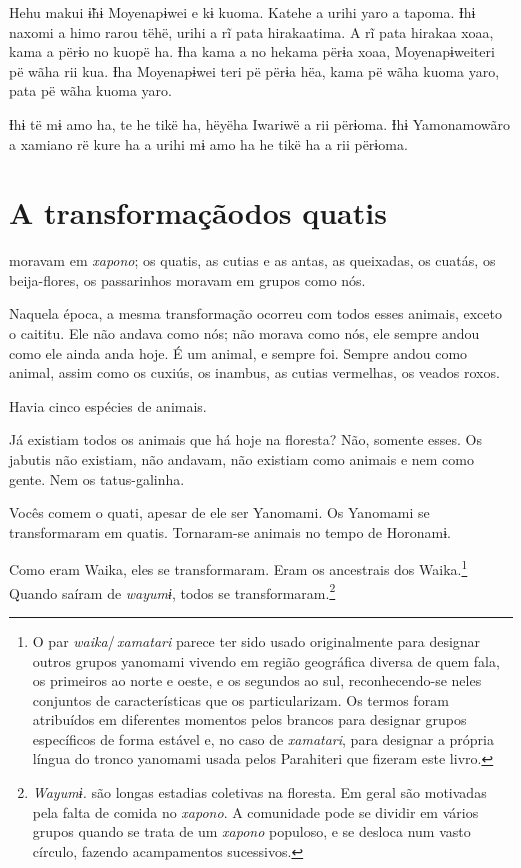 Hehu makui ɨ̃hɨ Moyenapɨwei e kɨ kuoma. Katehe a urihi yaro a tapoma. Ɨhɨ
naxomi a himo rarou tëhë, urihi a rĩ pata hirakaatima. A rĩ pata hirakaa
xoaa, kama a përɨo no kuopë ha. Ɨha kama a no hekama përɨa xoaa,
Moyenapɨweiteri pë wãha rii kua. Ɨha Moyenapɨwei teri pë përɨa hëa, kama
pë wãha kuoma yaro, pata pë wãha kuoma yaro. 

Ɨhɨ të mɨ amo ha, te he tikë ha, hëyëha Iwariwë a rii përɨoma. Ɨhɨ
Yamonamowãro a xamiano rë kure ha a urihi mɨ amo ha he tikë ha a rii
përɨoma. 

 
\chapter[A transformação dos quatis]{A transformação\break dos quatis}

 moravam em \textit{xapono}; os quatis, as cutias e as antas, as
queixadas, os cuatás, os beija-flores, os passarinhos moravam em grupos
como nós.

Naquela época, a mesma transformação ocorreu com todos esses animais,
exceto o caititu. Ele não andava como nós; não morava como nós, ele
sempre andou como ele ainda anda hoje. É um animal, e sempre foi. Sempre
andou como animal, assim como os cuxiús, os inambus, as cutias
vermelhas, os veados roxos.

Havia cinco espécies de animais. 

Já existiam todos os animais que há hoje na floresta? Não, somente
esses. Os jabutis não existiam, não andavam, não existiam como animais e
nem como gente. Nem os tatus-galinha. 

Vocês comem o quati, apesar de ele ser Yanomami. Os Yanomami se
transformaram em quatis. Tornaram-se animais no tempo de Horonamɨ. 

Como eram Waika, eles se transformaram. Eram os ancestrais dos Waika.\footnote{O par \textit{waika}/\,\textit{xamatari} parece ter sido usado originalmente para designar outros grupos yanomami vivendo em região geográfica diversa de quem fala, os primeiros ao norte e oeste, e os segundos ao sul, reconhecendo-se neles conjuntos de características que os particularizam. Os termos foram atribuídos em diferentes momentos pelos brancos para designar grupos específicos de forma estável e, no caso de \textit{xamatari}, para designar a própria língua do tronco yanomami usada pelos Parahiteri que fizeram este livro.} Quando saíram de \textit{wayumɨ}, todos se transformaram.\footnote{\textit{Wayumɨ.} são longas estadias coletivas na floresta. Em geral são motivadas pela falta de comida no \textit{xapono}. A comunidade pode se dividir em vários grupos quando se trata de um \textit{xapono} populoso, e se desloca num vasto círculo, fazendo acampamentos sucessivos.} 

